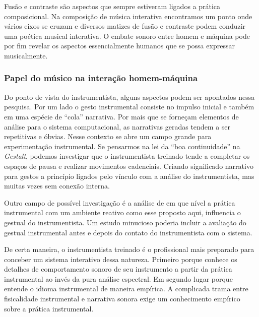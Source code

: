 \documentclass{ppgmus}
\begin{document}
Fusão e contraste são aspectos que sempre estiveram ligados a prática
composicional. Na composição de música interativa encontramos um ponto onde
vários eixos se cruzam e diversos matizes de fusão e contraste podem
conduzir uma poética musical interativa.
O embate sonoro entre homem e máquina pode por fim revelar os aspectos
essencialmente humanos que se possa expressar musicalmente. 


\subsubsection{Papel do músico na interação homem-máquina}



Do ponto de vista do instrumentista, alguns aspectos podem ser apontados nessa pesquisa.
Por um lado o gesto instrumental consiste no impulso inicial e também em uma espécie
de ``cola'' narrativa. Por mais que se forneçam elementos de análise para o sistema
computacional, as narrativas geradas tendem a ser repetitivas e óbvias. Nesse contexto
se abre um campo grande para experimentação instrumental. Se pensarmos na lei da ``boa continuidade''
na \textit{Gestalt}, podemos investigar que o instrumentista treinado tende a completar
os espaços de pausa e realizar movimentos cadenciais. Criando significado narrativo
para gestos a princípio ligados pelo vínculo com a análise do instrumentista, mas muitas
vezes sem conexão interna.

Outro campo de possível investigação é a análise de em que
nível a prática instrumental com um ambiente reativo como
esse proposto aqui, influencia o gestual do instrumentista.
Um estudo minucioso poderia incluir a avaliação do gestual
instrumental antes e depois do contato do instrumentista com 
o sistema.

De certa maneira, o instrumentista treinado é o profissional
mais preparado para conceber um sistema interativo dessa natureza.
Primeiro porque conhece os detalhes de comportamento sonoro de seu
instrumento a partir da prática instrumental ao invés da pura análise
espectral. Em segundo lugar porque entende o idioma instrumental
de maneira empírica. A complicada trama entre fisicalidade instrumental
e narrativa sonora exige um conhecimento empírico sobre a prática
instrumental.
\end{document}
